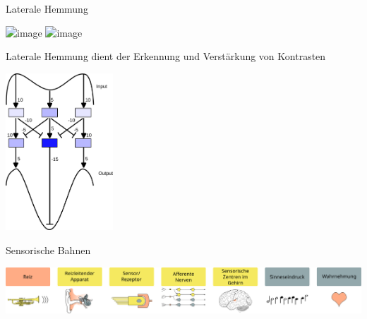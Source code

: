 \documentclass[aspectratio=169]{beamer}
\begin{document}
\begin{frame}{Laterale Hemmung}

\begin{center}

    \includegraphics<1>[width=\textwidth]{lateral_inhibition_funkction_1.png}
        \includegraphics<2>[width=\textwidth]{lateral_inhibition_funkction_2.png}
\end{center}

\end{frame}


\begin{frame}{Laterale Hemmung dient der Erkennung und Verstärkung von Kontrasten }

\begin{center}
    \includegraphics[width=0.301\textwidth]{laterale_hemmung.png}
\end{center}


\end{frame}

\begin{frame}{Sensorische Bahnen}
\begin{center}
    \includegraphics[width=\textwidth]{wahrnehmungsprozess.png}
\end{center}
    
\end{frame}



\end{document}
